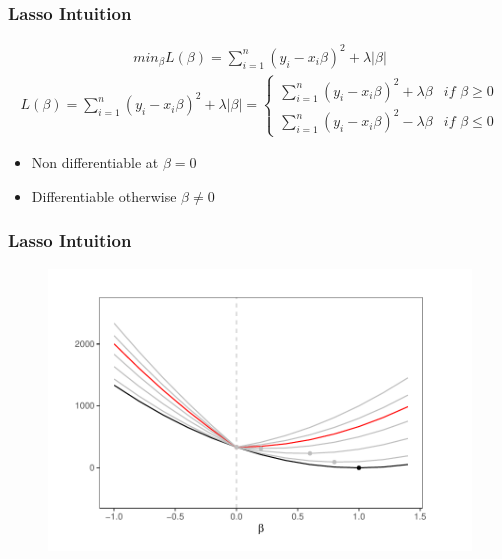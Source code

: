 \documentclass[
  shownotes,
  xcolor={svgnames},
  hyperref={colorlinks,citecolor=DarkBlue,linkcolor=DarkRed,urlcolor=DarkBlue}
  ]{beamer}
\begin{document}
\begin{frame}[fragile]
\frametitle{Lasso Intuition}

\begin{align}
min_{\beta} L(\beta) = \sum_{i=1}^n (y_i-x_i \beta)^2 + \lambda|\beta| 
\end{align}
\begin{align}
L(\beta)=\sum_{i=1}^{n}(y_{i}-x_{i}\beta)^{2}+\lambda|\beta|=\begin{cases}
\sum_{i=1}^{n}(y_{i}-x_{i}\beta)^{2}+\lambda\beta & if\,\,\beta\geq0\\
\sum_{i=1}^{n}(y_{i}-x_{i}\beta)^{2}-\lambda\beta & if\,\,\beta\leq0
\end{cases}
\end{align}

\begin{itemize}
  \item Non differentiable at $\beta=0$
  \item Differentiable otherwise $\beta\neq0$
\end{itemize}


\end{frame}
\begin{frame}[fragile]
\frametitle{Lasso Intuition}

   \begin{figure}[H] \centering
            \captionsetup{justification=centering}
              \includegraphics[scale=0.8]{figures/lasso.pdf}
 \end{figure}

 \end{frame}
\end{document}
